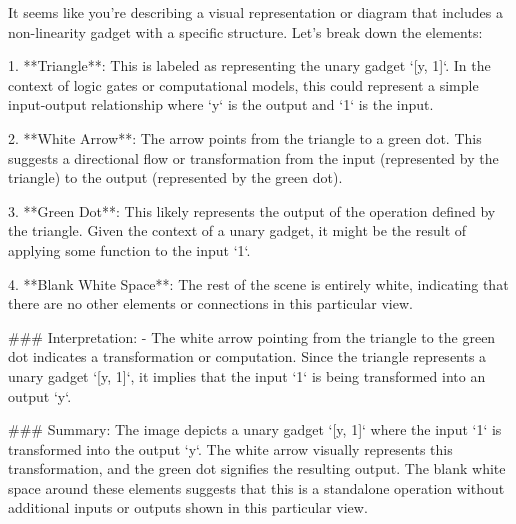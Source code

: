 It seems like you're describing a visual representation or diagram that includes a non-linearity gadget with a specific structure. Let's break down the elements:

1. **Triangle**: This is labeled as representing the unary gadget `[y, 1]`. In the context of logic gates or computational models, this could represent a simple input-output relationship where `y` is the output and `1` is the input.

2. **White Arrow**: The arrow points from the triangle to a green dot. This suggests a directional flow or transformation from the input (represented by the triangle) to the output (represented by the green dot).

3. **Green Dot**: This likely represents the output of the operation defined by the triangle. Given the context of a unary gadget, it might be the result of applying some function to the input `1`.

4. **Blank White Space**: The rest of the scene is entirely white, indicating that there are no other elements or connections in this particular view.

### Interpretation:
- The white arrow pointing from the triangle to the green dot indicates a transformation or computation. Since the triangle represents a unary gadget `[y, 1]`, it implies that the input `1` is being transformed into an output `y`.
  
### Summary:
The image depicts a unary gadget `[y, 1]` where the input `1` is transformed into the output `y`. The white arrow visually represents this transformation, and the green dot signifies the resulting output. The blank white space around these elements suggests that this is a standalone operation without additional inputs or outputs shown in this particular view.